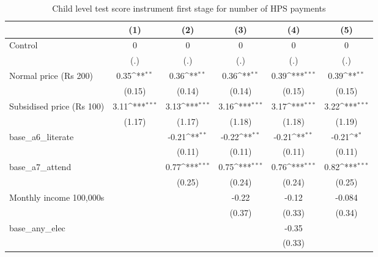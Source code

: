 \begin{table}[htbp]\centering
\def\sym#1{\ifmmode^{#1}\else\(^{#1}\)\fi}
\caption{Child level test score instrument first stage for number of HPS payments}
\begin{tabular*}{1\hsize}{@{\hskip\tabcolsep\extracolsep\fill}l*{5}{c}}
\toprule
                &\multicolumn{1}{c}{(1)}         &\multicolumn{1}{c}{(2)}         &\multicolumn{1}{c}{(3)}         &\multicolumn{1}{c}{(4)}         &\multicolumn{1}{c}{(5)}         \\
\midrule
Control         &        0         &        0         &        0         &        0         &        0         \\
                &      (.)         &      (.)         &      (.)         &      (.)         &      (.)         \\
Normal price (Rs 200)&     0.35\sym{**} &     0.36\sym{**} &     0.36\sym{**} &     0.39\sym{***}&     0.39\sym{**} \\
                &   (0.15)         &   (0.14)         &   (0.14)         &   (0.15)         &   (0.15)         \\
Subsidised price (Rs 100)&     3.11\sym{***}&     3.13\sym{***}&     3.16\sym{***}&     3.17\sym{***}&     3.22\sym{***}\\
                &   (1.17)         &   (1.17)         &   (1.18)         &   (1.18)         &   (1.19)         \\
base\_a6\_literate&                  &    -0.21\sym{**} &    -0.22\sym{**} &    -0.21\sym{**} &    -0.21\sym{*}  \\
                &                  &   (0.11)         &   (0.11)         &   (0.11)         &   (0.11)         \\
base\_a7\_attend  &                  &     0.77\sym{***}&     0.75\sym{***}&     0.76\sym{***}&     0.82\sym{***}\\
                &                  &   (0.25)         &   (0.24)         &   (0.24)         &   (0.25)         \\
Monthly income 100,000s&                  &                  &    -0.22         &    -0.12         &   -0.084         \\
                &                  &                  &   (0.37)         &   (0.33)         &   (0.34)         \\
base\_any\_elec   &                  &                  &                  &    -0.35         &                  \\
                &                  &                  &                  &   (0.33)         &                  \\

\end{tabular*}
\end{table}
